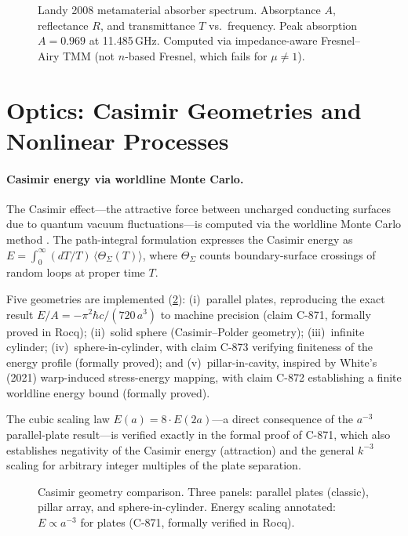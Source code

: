 \documentclass[12pt,openany]{report}
\theoremstyle{definition}
\theoremstyle{plain}
\theoremstyle{remark}
\begin{document}
\begin{figure}[htbp]
\centering

\caption{Landy 2008 metamaterial absorber spectrum.  Absorptance $A$,
reflectance $R$, and transmittance $T$ vs.\ frequency.  Peak absorption
$A = 0.969$ at 11.485\,GHz.  Computed via impedance-aware
Fresnel--Airy TMM (not $n$-based Fresnel, which fails for
$\mu \neq 1$).}
\label{fig:absorber}
\end{figure}


\section{Optics: Casimir Geometries and Nonlinear Processes}

\paragraph{Casimir energy via worldline Monte Carlo.}
The Casimir effect---the attractive force between uncharged conducting
surfaces due to quantum vacuum fluctuations---is computed via the
worldline Monte Carlo method \cite{Bastianelli2005}.  The path-integral
formulation expresses the Casimir energy as
$E = \int_0^\infty (dT/T)\, \langle\Theta_\Sigma(T)\rangle$, where
$\Theta_\Sigma$ counts boundary-surface crossings of random loops at
proper time $T$.

Five geometries are implemented (\cref{fig:casimir}): (i)~parallel
plates, reproducing the exact result $E/A = -\pi^2\hbar c/(720\,a^3)$
to machine precision (claim C-871, formally proved in Rocq);
(ii)~solid sphere (Casimir--Polder geometry); (iii)~infinite
cylinder; (iv)~sphere-in-cylinder, with claim C-873 verifying
finiteness of the energy profile (formally proved); and (v)~pillar-in-cavity,
inspired by White's (2021) warp-induced stress-energy mapping, with
claim C-872 establishing a finite worldline energy bound (formally proved).

The cubic scaling law $E(a) = 8 \cdot E(2a)$---a direct consequence of
the $a^{-3}$ parallel-plate result---is verified exactly in the formal
proof of C-871, which also establishes negativity of the Casimir energy
(attraction) and the general $k^{-3}$ scaling for arbitrary integer
multiples of the plate separation.

\begin{figure}[htbp]
\centering

\caption{Casimir geometry comparison.  Three panels: parallel plates
(classic), pillar array, and sphere-in-cylinder.  Energy scaling
annotated: $E \propto a^{-3}$ for plates (C-871, formally verified
in Rocq).}
\label{fig:casimir}
\end{figure}
\end{document}
